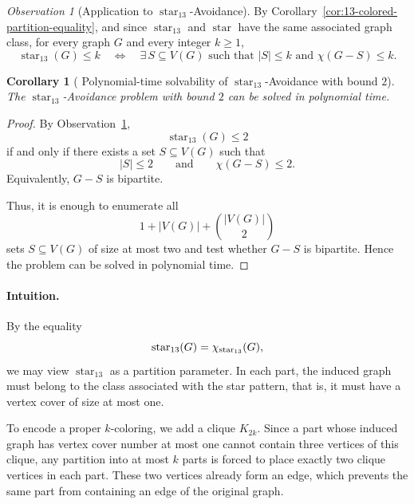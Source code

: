 \documentclass[12pt]{article}
\theoremstyle{plain}
\newtheorem{corollary}[theorem]{Corollary}
\theoremstyle{definition}
\theoremstyle{remark}
\newtheorem{observation}[theorem]{Observation}
\theoremstyle{definition}
\newcommand{\starlabel}{\mathrm{star}}
\DeclareRobustCommand{\starname}{%
  \ensuremath{\mathop{\starlabel}\nolimits}%
}
\DeclareRobustCommand{\starparam}[1]{%
  \ensuremath{\mathop{\starlabel}\nolimits_{#1}}%
}
\begin{document}
\begin{observation}[Application to \(\starparam{13}\)-Avoidance]
\label{obs:star13-avoidance-characterization}
By Corollary~\ref{cor:13-colored-partition-equality}, and since
\(\starparam{13}\) and \(\starname\) have the same associated graph class,
for every graph \(G\) and every integer \(k\ge1\),
\[
\starparam{13}(G)\le k
\quad\Longleftrightarrow\quad
\exists\,S\subseteq V(G)
\text{ such that }
|S|\le k
\text{ and }
\chi(G-S)\le k.
\]
\end{observation}




\begin{corollary}[
Polynomial-time solvability of
\texorpdfstring{\(\starparam{13}\)-Avoidance with bound \(2\)}
{star13-Avoidance with bound 2}
]
\label{cor:star13-k2}
The \(\starparam{13}\)-Avoidance problem with bound \(2\) can be solved
in polynomial time.
\end{corollary}

\begin{proof}
By Observation~\ref{obs:star13-avoidance-characterization},
\[
\starparam{13}(G)\le2
\]
if and only if there exists a set \(S\subseteq V(G)\) such that
\[
|S|\le2
\qquad\text{and}\qquad
\chi(G-S)\le2.
\]
Equivalently, \(G-S\) is bipartite.

Thus, it is enough to enumerate all
\[
1+|V(G)|+\binom{|V(G)|}{2}
\]
sets \(S\subseteq V(G)\) of size at most two and test whether \(G-S\)
is bipartite. Hence the problem can be solved in polynomial time.
\end{proof}


\paragraph{Intuition.}
By the equality
\[
\starparam{13}(G)=\chi_{\starparam{13}}(G),
\]
we may view \(\starparam{13}\) as a partition parameter. In each part, the
induced graph must belong to the class associated with the star pattern,
that is, it must have a vertex cover of size at most one.

To encode a proper \(k\)-coloring, we add a clique \(K_{2k}\). Since a part
whose induced graph has vertex cover number at most one cannot contain three
vertices of this clique, any partition into at most \(k\) parts is forced to
place exactly two clique vertices in each part. These two vertices already
form an edge, which prevents the same part from containing an edge of the
original graph.
\end{document}
